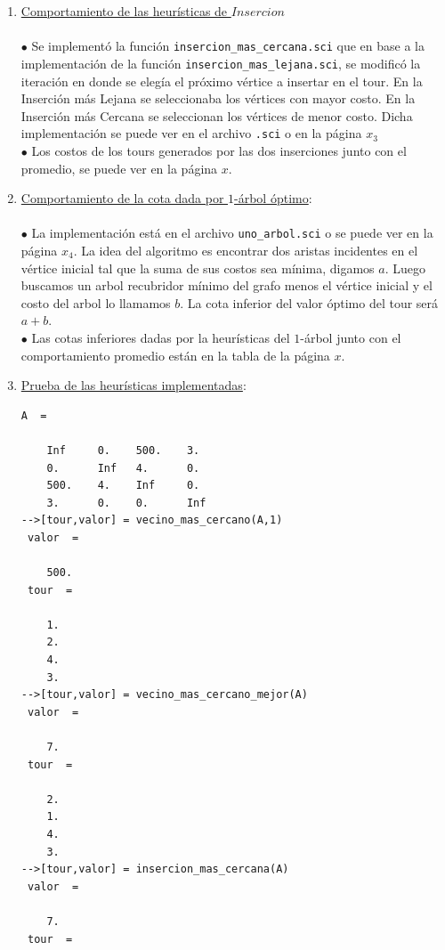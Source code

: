 \documentclass[10pt,a4paper]{report}
\begin{document}
\begin{enumerate}
\item \underline{Comportamiento de las heur\'isticas de $Insercion$}\\\\
$\bullet$ Se implement\'o la funci\'on \texttt{insercion\_mas\_cercana.sci} que en base a la implementaci\'on de la funci\'on \texttt{insercion\_mas\_lejana.sci}, se modific\'o la iteraci\'on en donde se eleg\'ia el pr\'oximo v\'ertice a insertar en el tour. En la Inserci\'on m\'as Lejana se seleccionaba los v\'ertices con mayor costo. En la Inserci\'on m\'as Cercana se seleccionan los v\'ertices de menor costo. Dicha implementaci\'on se puede ver en el archivo \texttt{.sci} o en la p\'agina $x_3$\\
$\bullet$ Los costos de los tours generados por las dos inserciones junto con el promedio, se puede ver en la p\'agina $x$.
\item \underline{Comportamiento de la cota dada por $1$-\'arbol \'optimo}:\\\\
$\bullet$  La implementaci\'on est\'a en el archivo \texttt{uno\_arbol.sci} o se puede ver en la p\'agina $x_4$. La idea del algoritmo es encontrar dos aristas incidentes en el v\'ertice inicial tal que la suma de sus costos sea m\'inima, digamos $a$. Luego buscamos un arbol recubridor m\'inimo del grafo menos el v\'ertice inicial y el costo del arbol lo llamamos $b$. La cota inferior del valor \'optimo del tour ser\'a $a+b$.\\
$\bullet$ Las cotas inferiores dadas por la heur\'isticas del $1$-\'arbol junto con el comportamiento promedio est\'an en la tabla de la p\'agina $x$.
\item \underline{Prueba de las heur\'isticas implementadas}:\\
\begin{lstlisting}[frame=single]
A  =
 
    Inf     0.    500.    3.  
    0.      Inf   4.      0.  
    500.    4.    Inf     0.  
    3.      0.    0.      Inf 
-->[tour,valor] = vecino_mas_cercano(A,1)
 valor  =
 
    500.  
 tour  =
 
    1.  
    2.  
    4.  
    3.
-->[tour,valor] = vecino_mas_cercano_mejor(A)
 valor  =
 
    7.  
 tour  =
 
    2.  
    1.  
    4.  
    3.  
-->[tour,valor] = insercion_mas_cercana(A)
 valor  =
 
    7.  
 tour  =
 

\end{lstlisting}
\end{enumerate}
\end{document}
